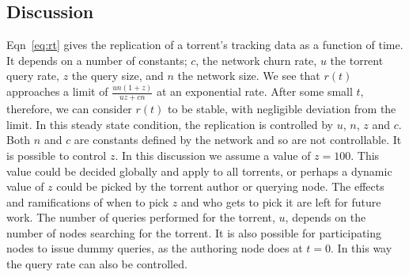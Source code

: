 \subsection{Discussion}\label{sec:extension:discussion}

    Eqn~\ref{eq:rt} gives the replication of a torrent's tracking data as a function of time. It depends on a number of constants; $c$, the network churn rate, $u$ the torrent query rate, $z$ the query size, and $n$ the network size. We see that $r(t)$ approaches a limit of $\frac{un(1+z)}{uz+cn}$ at an exponential rate. After some small $t$, therefore, we can consider $r(t)$ to be stable, with negligible deviation from the limit. In this steady state condition, the replication is controlled by $u$, $n$, $z$ and $c$. Both $n$ and $c$ are constants defined by the network and so are not controllable. It is possible to control $z$. In this discussion we assume a value of $z=100$. This value could be decided globally and apply to all torrents, or perhaps a dynamic value of $z$ could be picked by the torrent author or querying node. The effects and ramifications of when to pick $z$ and who gets to pick it are left for future work. The number of queries performed for the torrent, $u$, depends on the number of nodes searching for the torrent. It is also possible for participating nodes to issue dummy queries, as the authoring node does at $t=0$. In this way the query rate can also be controlled.

